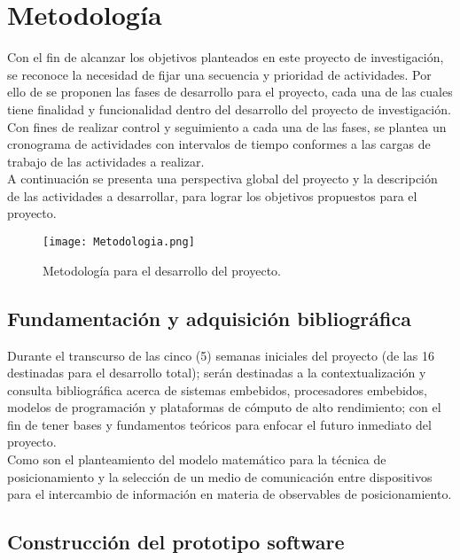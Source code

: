 \chapter{Metodología}

Con el fin de alcanzar los objetivos planteados en este proyecto de investigación, se reconoce la necesidad de fijar una secuencia y prioridad de actividades. Por ello de se proponen las fases de desarrollo para el proyecto, cada una de las cuales tiene finalidad y funcionalidad dentro del desarrollo del proyecto de investigación. Con fines de realizar control y seguimiento a cada una de las fases, se plantea un cronograma de actividades con intervalos de tiempo conformes a las cargas de trabajo de las actividades a realizar.\\

A continuación se presenta una perspectiva global del proyecto y la descripción de las actividades a desarrollar, para lograr los objetivos propuestos para el proyecto.

	\begin{figure}[ht]
		    \centering
		    \texttt{[image: Metodologia.png]}
		    \caption{Metodología para el desarrollo del proyecto.}
		    \label{fig:Metodologia}
	\end{figure}



\section{Fundamentación y adquisición bibliográfica}

Durante el transcurso de las cinco (5) semanas iniciales del proyecto (de las 16 destinadas para el desarrollo total); serán destinadas a la contextualización y consulta bibliográfica acerca de sistemas embebidos, procesadores embebidos, modelos de programación y plataformas de cómputo de alto rendimiento; con el fin de tener bases y fundamentos teóricos para enfocar el futuro inmediato del proyecto.\\

Como son el planteamiento del modelo matemático para la técnica de posicionamiento y la selección de un medio de comunicación entre dispositivos para el intercambio de información en materia de observables de posicionamiento.

\section{Construcción del prototipo software}

